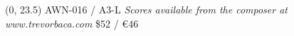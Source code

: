 \documentclass[10pt]{article}
\begin{document}
\begin{textblock}{23}(0, 23.5)
AWN-016 / A3-L \hfill
\textit{Scores available from the composer at www.trevorbaca.com} \hfill
\$52 / \euro 46
\end{textblock}
\end{document}
